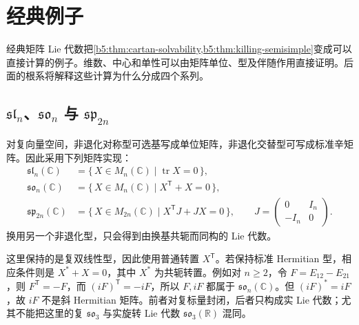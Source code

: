 
\section{经典例子}
\label{b5:sec:1304}

%
%
%

经典矩阵 Lie 代数把\cref{b5:thm:cartan-solvability,b5:thm:killing-semisimple}变成可以直接计算的例子。维数、中心和单性可以由矩阵单位、型及伴随作用直接证明。后面的根系将解释这些计算为什么分成四个系列。

\subsection{\texorpdfstring{\(\mathfrak{sl}_n\)、\(\mathfrak{so}_n\) 与 \(\mathfrak{sp}_{2n}\)}{sln、son 与 sp2n}}
\label{b5:subsec:1304:01}

对复向量空间，非退化对称型可选基写成单位矩阵，非退化交替型可写成标准辛矩阵。因此采用下列矩阵实现：
\[
	\begin{aligned}
		\mathfrak{sl}_n(\mathbb C)&=\bigl\{\,X\in M_n(\mathbb C)\mid\operatorname{tr}X=0\,\bigr\},\\
		\mathfrak{so}_n(\mathbb C)&=\bigl\{\,X\in M_n(\mathbb C)\mid X^{\mathsf T}+X=0\,\bigr\},\\
		\mathfrak{sp}_{2n}(\mathbb C)&=\bigl\{\,X\in M_{2n}(\mathbb C)\mid X^{\mathsf T}J+JX=0\,\bigr\},\qquad
		J=\begin{pmatrix}0&I_n\\-I_n&0\end{pmatrix}.
	\end{aligned}
\]
换用另一个非退化型，只会得到由换基共轭而同构的 Lie 代数。

\ProseParagraphBreak

这里保持的是复双线性型，因此使用普通转置 \(X^{\mathsf T}\)。若保持标准 Hermitian 型，相应条件则是 \(X^*+X=0\)，其中 \(X^*\) 为共轭转置。例如对 \(n\ge2\)，令 \(F=E_{12}-E_{21}\)，则 \(F^{\mathsf T}=-F\)，而 \((iF)^{\mathsf T}=-iF\)，所以 \(F,iF\) 都属于 \(\mathfrak{so}_n(\mathbb C)\)。但 \((iF)^*=iF\)，故 \(iF\) 不是斜 Hermitian 矩阵。前者对复标量封闭，后者只构成实 Lie 代数；尤其不能把这里的复 \(\mathfrak{so}_3\) 与实旋转 Lie 代数 \(\mathfrak{so}_3(\mathbb R)\) 混同。


